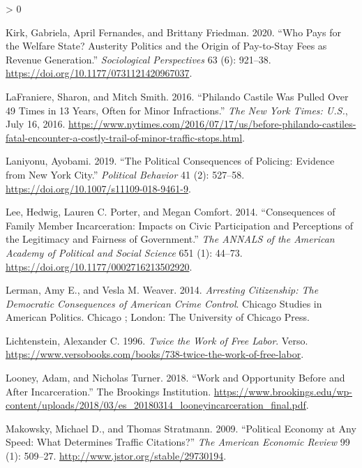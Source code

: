 \documentclass[
  12pt,
]{article}
\newlength{\cslhangindent}
\newenvironment{CSLReferences}[2] %
 {%
  \setlength{\parindent}{0pt}
  \ifodd #1 \everypar{\setlength{\hangindent}{\cslhangindent}}\ignorespaces\fi
  \ifnum #2 > 0
  \setlength{\parskip}{#2\baselineskip}
  \fi
 }%
 {}
\begin{document}
\begin{CSLReferences}{1}{0}
\leavevmode\hypertarget{ref-Kirk2020}{}%
Kirk, Gabriela, April Fernandes, and Brittany Friedman. 2020. {``Who {Pays} for the {Welfare State}? {Austerity Politics} and the {Origin} of {Pay}-to-{Stay Fees} as {Revenue Generation}.''} \emph{Sociological Perspectives} 63 (6): 921--38. \url{https://doi.org/10.1177/0731121420967037}.

\leavevmode\hypertarget{ref-LaFraniere2016}{}%
LaFraniere, Sharon, and Mitch Smith. 2016. {``Philando {Castile Was Pulled Over} 49 {Times} in 13 {Years}, {Often} for {Minor Infractions}.''} \emph{The New York Times: U.S.}, July 16, 2016. \url{https://www.nytimes.com/2016/07/17/us/before-philando-castiles-fatal-encounter-a-costly-trail-of-minor-traffic-stops.html}.

\leavevmode\hypertarget{ref-Laniyonu2019}{}%
Laniyonu, Ayobami. 2019. {``The {Political Consequences} of {Policing}: {Evidence} from {New York City}.''} \emph{Political Behavior} 41 (2): 527--58. \url{https://doi.org/10.1007/s11109-018-9461-9}.

\leavevmode\hypertarget{ref-Lee2014}{}%
Lee, Hedwig, Lauren C. Porter, and Megan Comfort. 2014. {``Consequences of {Family Member Incarceration}: {Impacts} on {Civic Participation} and {Perceptions} of the {Legitimacy} and {Fairness} of {Government}.''} \emph{The ANNALS of the American Academy of Political and Social Science} 651 (1): 44--73. \url{https://doi.org/10.1177/0002716213502920}.

\leavevmode\hypertarget{ref-Lerman2014}{}%
Lerman, Amy E., and Vesla M. Weaver. 2014. \emph{Arresting Citizenship: The Democratic Consequences of {American} Crime Control}. Chicago Studies in {American} Politics. {Chicago ; London}: {The University of Chicago Press}.

\leavevmode\hypertarget{ref-Lichtenstein1996}{}%
Lichtenstein, Alexander C. 1996. \emph{Twice the {Work} of {Free Labor}}. {Verso}. \url{https://www.versobooks.com/books/738-twice-the-work-of-free-labor}.

\leavevmode\hypertarget{ref-Looney2018}{}%
Looney, Adam, and Nicholas Turner. 2018. {``Work and Opportunity Before and After Incarceration.''} {The Brookings Institution}. \url{https://www.brookings.edu/wp-content/uploads/2018/03/es_20180314_looneyincarceration_final.pdf}.

\leavevmode\hypertarget{ref-Makowsky2009}{}%
Makowsky, Michael D., and Thomas Stratmann. 2009. {``Political {Economy} at {Any Speed}: {What Determines Traffic Citations}?''} \emph{The American Economic Review} 99 (1): 509--27. \url{http://www.jstor.org/stable/29730194}.


\end{CSLReferences}
\end{document}
